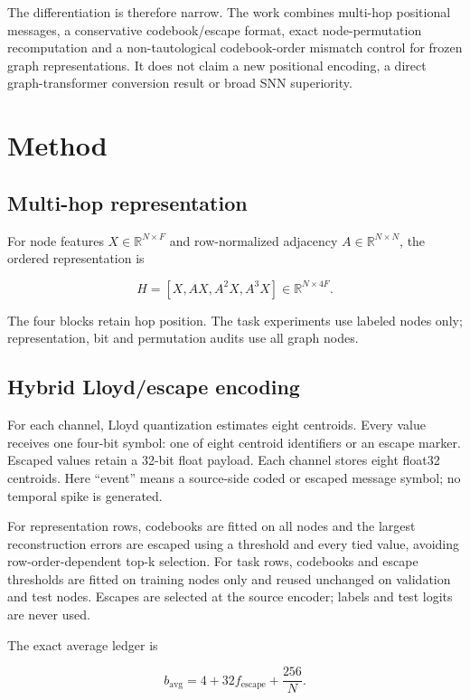 \documentclass{article}
\begin{document}
The differentiation is therefore narrow. The work combines multi-hop positional messages, a conservative codebook/escape format, exact node-permutation recomputation and a non-tautological codebook-order mismatch control for frozen graph representations. It does not claim a new positional encoding, a direct graph-transformer conversion result or broad SNN superiority.

\section{Method}


\subsection{Multi-hop representation}


For node features \(X\in\mathbb{R}^{N\times F}\) and row-normalized adjacency \(A\in\mathbb{R}^{N\times N}\), the ordered representation is

\[
H = [X, AX, A^2X, A^3X] \in \mathbb{R}^{N\times 4F}.
\]

The four blocks retain hop position. The task experiments use labeled nodes only; representation, bit and permutation audits use all graph nodes.

\subsection{Hybrid Lloyd/escape encoding}


For each channel, Lloyd quantization estimates eight centroids. Every value receives one four-bit symbol: one of eight centroid identifiers or an escape marker. Escaped values retain a 32-bit float payload. Each channel stores eight float32 centroids. Here ``event'' means a source-side coded or escaped message symbol; no temporal spike is generated.

For representation rows, codebooks are fitted on all nodes and the largest reconstruction errors are escaped using a threshold and every tied value, avoiding row-order-dependent top-k selection. For task rows, codebooks and escape thresholds are fitted on training nodes only and reused unchanged on validation and test nodes. Escapes are selected at the source encoder; labels and test logits are never used.

The exact average ledger is

\[
b_{\mathrm{avg}} = 4 + 32 f_{\mathrm{escape}} + \frac{256}{N}.
\]
\end{document}
